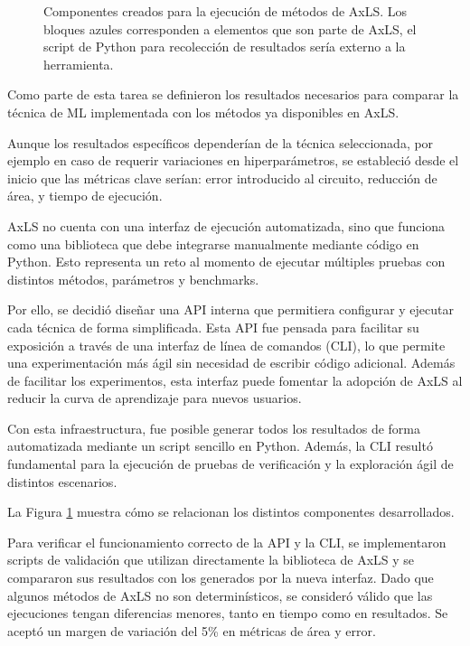 \begin{figure}[b]
  \begin{center}
    
  \end{center}
  \caption{Componentes creados para la ejecución de métodos de AxLS. Los bloques azules corresponden a elementos que son parte de AxLS, el script de Python para recolección de resultados sería externo a la herramienta.}
  \label{fig:runner}
\end{figure}

Como parte de esta tarea se definieron los resultados necesarios para comparar
la técnica de ML implementada con los métodos ya disponibles en AxLS.

Aunque los resultados específicos dependerían de la técnica seleccionada, por
ejemplo en caso de requerir variaciones en hiperparámetros, se estableció
desde el inicio que las métricas clave serían: error introducido al circuito,
reducción de área, y tiempo de ejecución.

AxLS no cuenta con una interfaz de ejecución automatizada, sino que funciona
como una biblioteca que debe integrarse manualmente mediante código en Python.
Esto representa un reto al momento de ejecutar múltiples pruebas con distintos
métodos, parámetros y benchmarks.

Por ello, se decidió diseñar una API interna que permitiera configurar y
ejecutar cada técnica de forma simplificada. Esta API fue pensada para
facilitar su exposición a través de una interfaz de línea de comandos (CLI), lo
que permite una experimentación más ágil sin necesidad de escribir código
adicional. Además de facilitar los experimentos, esta interfaz puede fomentar
la adopción de AxLS al reducir la curva de aprendizaje para nuevos usuarios.

Con esta infraestructura, fue posible generar todos los resultados de forma
automatizada mediante un script sencillo en Python.
Además, la CLI resultó fundamental para la ejecución de pruebas de verificación
y la exploración ágil de distintos escenarios.

La Figura \ref{fig:runner} muestra cómo se relacionan los distintos componentes
desarrollados.

Para verificar el funcionamiento correcto de la API y la CLI, se implementaron
scripts de validación que utilizan directamente la biblioteca de AxLS y se
compararon sus resultados con los generados por la nueva interfaz. Dado que
algunos métodos de AxLS no son determinísticos, se consideró válido que las
ejecuciones tengan diferencias menores, tanto en tiempo como en resultados. Se
aceptó un margen de variación del 5\% en métricas de área y error.

